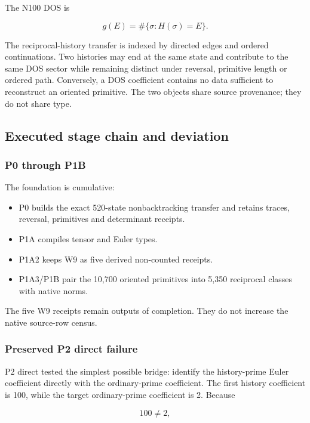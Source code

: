The N100 DOS is

\[
g(E)=\#\{\sigma:H(\sigma)=E\}.
\]

The reciprocal-history transfer is indexed by directed edges and ordered
continuations. Two histories may end at the same state and contribute to
the same DOS sector while remaining distinct under reversal, primitive
length or ordered path. Conversely, a DOS coefficient contains no data
sufficient to reconstruct an oriented primitive. The two objects share
source provenance; they do not share type.

\subsection{Executed stage chain and
deviation}\label{viii-ch09-executed-stage-chain-and-deviation}

\subsubsection{P0 through P1B}\label{viii-ch09-p0-through-p1b}

The foundation is cumulative:

\begin{itemize}
\tightlist
\item
  P0 builds the exact 520-state nonbacktracking transfer and retains
  traces, reversal, primitives and determinant receipts.
\item
  P1A compiles tensor and Euler types.
\item
  P1A2 keeps W9 as five derived non-counted receipts.
\item
  P1A3/P1B pair the 10,700 oriented primitives into 5,350 reciprocal
  classes with native norms.
\end{itemize}

The five W9 receipts remain outputs of completion. They do not increase
the native source-row census.

\subsubsection{Preserved P2 direct
failure}\label{viii-ch09-preserved-p2-direct-failure}

P2 direct tested the simplest possible bridge: identify the
history-prime Euler coefficient directly with the ordinary-prime
coefficient. The first history coefficient is 100, while the target
ordinary-prime coefficient is 2. Because

\[
100\ne2,
\]

